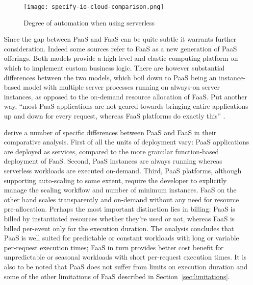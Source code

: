 \begin{figure}[h]
  \centering
  \texttt{[image: specify-io-cloud-comparison.png]}
  \caption{Degree of automation when using serverless \parencite{wolf16serverless}}
  \label{fig:degreeOfAutomation}
\end{figure}

Since the gap between PaaS and FaaS can be quite subtle it warrants further consideration. Indeed some sources \parencite[including][]{adzic2017serverless} refer to FaaS as a new generation of PaaS offerings. Both models provide a high-level and elastic computing platform on which to implement custom business logic. There are however substantial differences between the two models, which boil down to PaaS being an instance-based model with multiple server processes running on always-on server instances, as opposed to the on-demand resource allocation of FaaS. Put another way, ``most PaaS applications are not geared towards bringing entire applications up and down for every request, whereas FaaS platforms do exactly this'' \parencite{robert2016serverlessarchitectures}.

\textcite{albuquerque17faaspaas} derive a number of specific differences between PaaS and FaaS in their comparative analysis. First of all the units of deployment vary: PaaS applications are deployed as services, compared to the more granular function-based deployment of FaaS. Second, PaaS instances are always running whereas serverless workloads are executed on-demand. Third, PaaS platforms, although supporting auto-scaling to some extent, require the developer to explicitly manage the scaling workflow and number of minimum instances. FaaS on the other hand scales transparently and on-demand without any need for resource pre-allocation. Perhaps the most important distinction lies in billing: PaaS is billed by instantiated resources whether they're used or not, whereas FaaS is billed per-event only for the execution duration. The analysis concludes that PaaS is well suited for predictable or constant workloads with long or variable per-request execution times; FaaS in turn provides better cost benefit for unpredictable or seasonal workloads with short per-request execution times. It is also to be noted that PaaS does not suffer from limits on execution duration and some of the other limitations of FaaS described in Section~\ref{sec:limitations}.

